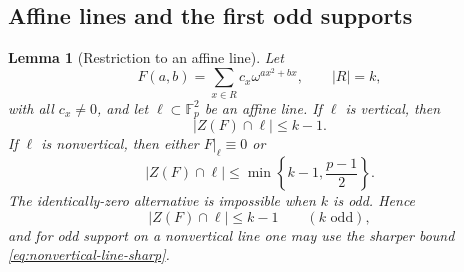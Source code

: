 \documentclass[11pt]{article}
\newtheorem{lemma}[theorem]{Lemma}
\newcommand{\F}{\mathbb F}
\begin{document}
\subsection{Affine lines and the first odd supports}

\begin{lemma}[Restriction to an affine line]
\label{lem:affine-line-zero-bound}
Let
\[
 F(a,b)=\sum_{x\in R}c_x\omega^{a x^2+b x},\qquad |R|=k,
\]
with all $c_x\ne0$, and let $\ell\subset\F_p^2$ be an affine line.
If $\ell$ is vertical, then
\[
 |Z(F)\cap\ell|\le k-1.
\]
If $\ell$ is nonvertical, then either $F|_\ell\equiv0$ or
\begin{equation}
 |Z(F)\cap\ell|
 \le
 \min\left\{k-1,\frac{p-1}{2}\right\}.
 \label{eq:nonvertical-line-sharp}
\end{equation}
The identically-zero alternative is impossible when $k$ is odd.  Hence
\begin{equation}
 |Z(F)\cap\ell|\le k-1
 \qquad(k\text{ odd}),
 \label{eq:odd-line-bound}
\end{equation}
and for odd support on a nonvertical line one may use the sharper
bound \eqref{eq:nonvertical-line-sharp}.
\end{lemma}
\end{document}
